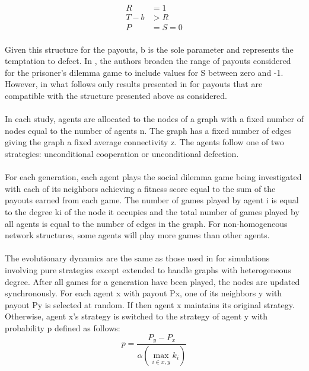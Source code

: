 \documentclass{article}
\begin{document}
    \begin{align}
    	R&=1\\
    	T-b&>R\\
    	P&=S=0
    \end{align}

    \paragraph{}Given this structure for the payouts, b is the sole parameter and represents the temptation to defect.  In \cite{Santos2006c}, the authors broaden the range of payouts considered for the prisoner's dilemma game to include values for S between zero and -1.  However, in what follows only results presented in \cite{Santos2006c} for payouts that are compatible with the structure presented above as considered.
    \paragraph{}In each study, agents are allocated to the nodes of a graph with a fixed number of nodes equal to the number of agents n.  The graph has a fixed number of edges giving the graph a fixed average connectivity z.  The agents follow one of two strategies: unconditional cooperation or unconditional defection.
    \paragraph{}For each generation, each agent plays the social dilemma game being investigated with each of its neighbors achieving a fitness score equal to the sum of the payouts earned from each game.  The number of games played by agent i is equal to the degree ki of the node it occupies and the total number of games played by all agents is equal to the number of edges in the graph.  For non-homogeneous network structures, some agents will play more games than other agents.
    \paragraph{}The evolutionary dynamics are the same as those used in \cite{Hauert2004} for simulations involving pure strategies except extended to handle graphs with heterogeneous degree.  After all games for a generation have been played, the nodes are updated synchronously.  For each agent x with payout Px, one of its neighbors y with payout Py is selected at random.  If  then agent x maintains its original strategy.  Otherwise, agent x's strategy is switched to the strategy of agent y with probability p defined as follows:
    \begin{equation}
    	p=\frac{P_y-P_x}{\alpha\left(\max_{i\in{x,y}}k_i\right)}
    \end{equation}
\end{document}
